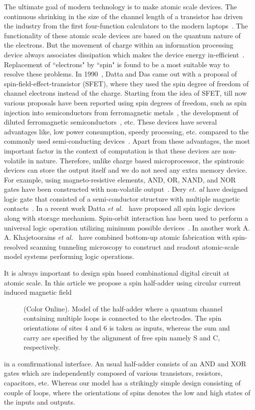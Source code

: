 \documentclass[prb,aps,twocolumn,amsmath,amssymb,floatfix,superscriptaddress]{revtex4}
\begin{document}
The ultimate goal of modern technology is to make atomic scale devices. The
continuous shrinking in the size of the channel length of a transistor has driven the industry
from the first four-function calculators to the modern laptops~\cite{datta}. The functionality
of these atomic scale devices are based on the quantum nature of the electrons. But the movement
of charge within an information processing device always associates dissipation which makes the
device energy in-efficient~\cite{SB}. Replacement of ``electrons" by ``spin" is found to be
a most suitable way to resolve these problems. In 1990~\cite{SFET}, Datta and Das came out with
a proposal of spin-field-effect-transistor (SFET), where they used the spin degree of freedom of channel
electrons instead of the charge. Starting from the idea of SFET, till now various proposals have been
reported using spin degrees of freedom, such as spin injection into semiconductors from ferromagnetic
metals~\cite{spin1,spin2,spin3,spin4,spin5}, the development of diluted ferromagnetic
semiconductors~\cite{spin6,spin7}, etc. These devices have several advantages like,
low power consumption, speedy processing, etc. compared to the commonly used semi-conducting
devices~\cite{ref6,ref7,ref8,ref9}. Apart from these advantages, the most important factor in the
context of computation is that these devices are non-volatile in nature. Therefore, unlike charge
based microprocessor, the spintronic devices can store the output itself and we do not need any extra
memory device. For example, using magneto-resistive elements, AND, OR, NAND, and NOR gates have
been constructed with non-volatile output~\cite{ref4}. Dery {\it et. al} have designed logic gate
that consisted of a semi-conductor structure with multiple magnetic contacts~\cite{lg1}. In a recent
work Datta {\it et al.}~\cite{LGS5} have proposed all spin logic devices along with storage mechanism.
Spin-orbit interaction has been used to perform a universal logic operation utilizing minimum
possible devices~\cite{lg2}. In another work A. A. Khajetoorains {\it et al.}~\cite{lg3} have combined
bottom-up atomic fabrication with spin-resolved scanning tunneling microscopy to construct and readout
atomic-scale model systems performing logic operations.

It is always important to design spin based combinational digital circuit at atomic scale. In this article
we propose a spin half-adder using circular current induced magnetic field
\begin{figure}
{\centering{}\par}
\caption{(Color Online). Model of the half-adder where a quantum channel containing multiple
loops is connected to the electrodes. The spin orientations
of sites 4 and 6 is taken as inputs, whereas the sum and carry are specified by the alignment
of free spin namely S and C, respectively.}
\label{fig1}
\end{figure}
in a comfirmational interface. An usual half-adder consists of an AND and XOR gates which are
independently composed of various transistors, resistors, capacitors, etc. Whereas our model has a
strikingly simple design consisting of couple of loops, where the orientations of spins denotes the
low and high states of the inputs and outputs. 
\end{document}
